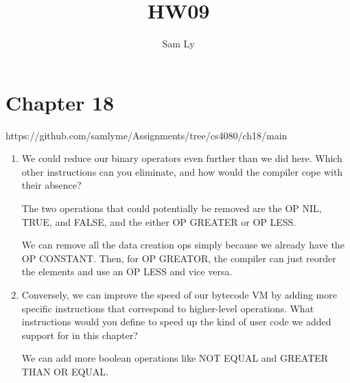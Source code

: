 \documentclass{article}
\title{HW09}
\author{Sam Ly}
\begin{document}
\maketitle

\section*{Chapter 18}
https://github.com/samlyme/Assignments/tree/cs4080/ch18/main

\begin{enumerate}
    \item {
        We could reduce our binary operators even further than we did here. Which other instructions can you eliminate, and how would the compiler cope with their absence?

        The two operations that could potentially be removed are the OP NIL, TRUE, and FALSE,
        and the either OP GREATER or OP LESS.

        We can remove all the data creation ops simply because we already have the 
        OP CONSTANT. Then, for OP GREATOR, the compiler can just reorder the elements 
        and use an OP LESS and vice versa.
    }
    \item {
        Conversely, we can improve the speed of our bytecode VM by adding more specific instructions that correspond to higher-level operations. What instructions would you define to speed up the kind of user code we added support for in this chapter?

        We can add more boolean operations like NOT EQUAL and GREATER THAN OR EQUAL.

    }
\end{enumerate}
\end{document}
